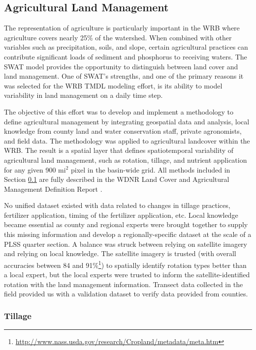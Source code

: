 \subsection{Agricultural Land Management}\label{sec:ag_land_mgt}
The representation of agriculture is particularly important in the WRB where agriculture covers nearly
25\% of the watershed. When combined with other variables such as precipitation, soils,
and slope, certain agricultural practices can contribute significant loads of sediment and phosphorus to receiving waters.  
The SWAT model provides the opportunity to distinguish between land cover and land management. 
One of SWAT’s strengths, and one of the primary reasons it was selected for the WRB TMDL modeling effort, is its ability to model variability in land management on a daily time step.

The objective of this effort was to develop and implement a methodology to define agricultural management by integrating geospatial data and analysis, local knowledge from county land and water conservation staff, private agronomists, and field data. The methodology was applied to agricultural landcover within the WRB. The result is a spatial layer that defines spatiotemporal variability of agricultural land management, such as rotation, tillage, and nutrient application for any given 900 mi$^2$ pixel in the basin-wide grid. All methods included in Section \ref{sec:ag_land_mgt} are fully described in the WDNR Land Cover and Agricultural Management Definition Report .

No unified dataset existed with data related to changes in tillage practices, fertilizer application, timing of the fertilizer application, etc.  Local knowledge became essential as county and regional experts were brought together to supply this missing information and develop a regionally-specific dataset at the scale of a PLSS quarter section. A balance was struck between relying on satellite imagery and relying on local knowledge. The satellite imagery is trusted (with overall accuracies between  84 and 91\%\footnote{\url{http://www.nass.usda.gov/research/Cropland/metadata/meta.htm}}) to spatially identify rotation types better than a local expert, but the local experts were trusted to inform the satellite-identified rotation with the land management information. Transect data collected in the field provided us with a validation dataset to verify data provided from counties.

\subsubsection{Tillage}

